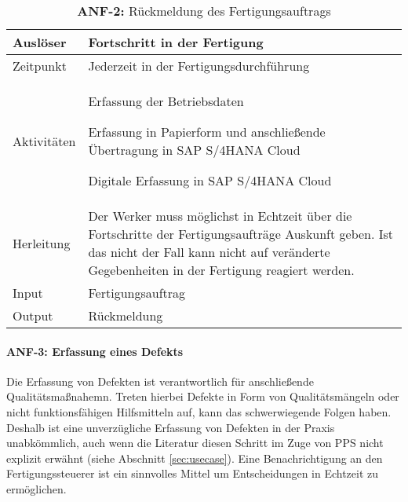 \begin{table}[H]
	\centering
	\begin{tabularx}{\textwidth}{|l|X|} 
		\hline
		Auslöser                                     &   
		Fortschritt in der Fertigung \\ 
		\hline\hline
		Zeitpunkt                                     &   
		Jederzeit in der Fertigungsdurchführung \\ 
		\hline\hline
		Aktivitäten &   
		\begin{minipage}{4.8in}
    		\begin{compactenum}
        		\renewcommand{\labelenumi}{(\arabic{enumi})}
        		\item Erfassung der Betriebsdaten
            		\begin{compactenum}
            		\renewcommand{\labelenumi}{(\arabic{enumi})}
            		\item Erfassung in Papierform und anschließende Übertragung in SAP S/4HANA Cloud
            		\item Digitale Erfassung in SAP S/4HANA Cloud
            		\end{compactenum}
    		\end{compactenum}
    		\vspace{1pt}		
		\end{minipage} \\
		\hline\hline
		Herleitung                                        &   
		Der Werker muss möglichst in Echtzeit über die Fortschritte der Fertigungsaufträge Auskunft geben. 
		Ist das nicht der Fall kann nicht auf veränderte Gegebenheiten in der Fertigung reagiert werden.\\
		\hline\hline
		Input                                         &   
		Fertigungsauftrag  \\ 
		\hline\hline
		Output                                        &   
		Rückmeldung \\
		\hline
	\end{tabularx}
	\caption{\label{tab:anf1}\textbf{ANF-2:} Rückmeldung des Fertigungsauftrags}
\end{table}

\paragraph{ANF-3: Erfassung eines Defekts}
Die Erfassung von Defekten ist verantwortlich für anschließende Qualitätsmaßnahemn. 
Treten hierbei Defekte in Form von Qualitätsmängeln oder nicht funktionsfähigen Hilfsmitteln auf, kann das schwerwiegende Folgen haben. Deshalb ist eine unverzügliche Erfassung von Defekten in der Praxis unabkömmlich, auch wenn die Literatur diesen Schritt im Zuge von \ac{PPS} nicht explizit erwähnt (siehe Abschnitt \ref{sec:usecase}). Eine Benachrichtigung an den Fertigungssteuerer ist ein sinnvolles Mittel um Entscheidungen in Echtzeit zu ermöglichen.

